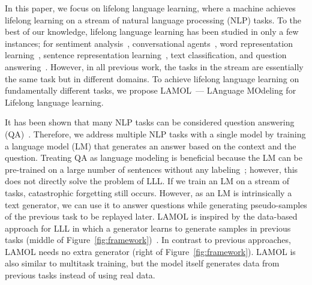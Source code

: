 \documentclass{article} %
\begin{document}
In this paper, we focus on lifelong language learning, where a machine achieves lifelong learning on a stream of natural language processing (NLP) tasks.
To the best of our knowledge, lifelong language learning has been studied in only a few instances; 
for sentiment analysis~\citep{chen-etal-2015-lifelong,8101496}, conversational agents~\citep{LLL_chatbot}, word representation learning~\citep{LLL_word}, sentence representation learning~\citep{Liu2019ContinualLF}, text classification, and question answering~\citep{d2019episodic}.
However, in all previous work, the tasks in the stream are essentially the same task but in different domains.
To achieve lifelong language learning on fundamentally different tasks, we propose LAMOL~--- LAnguage MOdeling for Lifelong language learning.


    
It has been shown that many NLP tasks can be considered question answering (QA)~\citep{McCann2018decaNLP}.
Therefore, we address multiple NLP tasks with a single model by training a language model (LM) that generates an answer based on the context and the question.  
Treating QA as language modeling is beneficial because the LM can be pre-trained on a large number of sentences without any labeling~\citep{radford2019language}; however, this does not directly solve the problem of LLL.
If we train an LM on a stream of tasks, catastrophic forgetting still occurs. 
However, as an LM is intrinsically a text generator, we can use it to answer questions while generating pseudo-samples of the previous task to be replayed later.
LAMOL is inspired by the data-based approach for LLL in which a generator learns to generate samples in previous tasks (middle of Figure~\ref{fig:framework})~\citep{shin2017continual,kemker2017fearnet}.
In contrast to previous approaches, LAMOL needs no extra generator (right of Figure~\ref{fig:framework}).
LAMOL is also similar to multitask training, but the model itself generates data from previous tasks instead of using real data.
\end{document}
